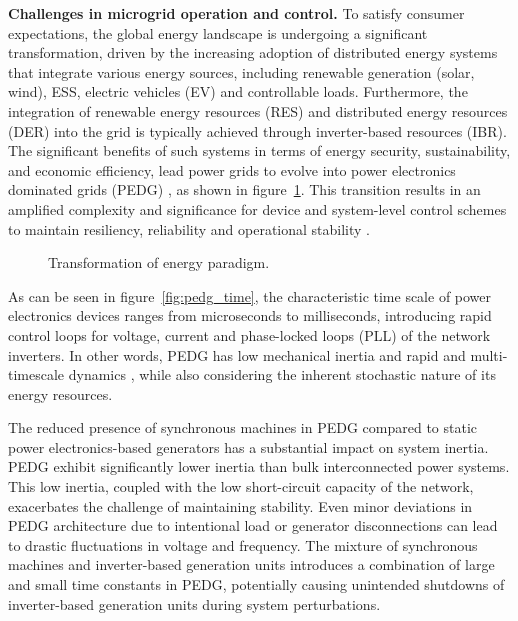 \textbf{Challenges in microgrid operation and control.}
To satisfy consumer expectations, the global energy landscape is undergoing a significant transformation, driven by the increasing adoption of distributed energy systems that integrate various energy sources, including renewable generation (solar, wind), ESS, electric vehicles (EV) and controllable loads. Furthermore, the integration of renewable energy resources (RES) and distributed energy resources (DER) into the grid is typically achieved through inverter-based resources (IBR). The significant benefits of such systems in terms of energy security, sustainability, and economic efficiency, lead power grids to evolve into power electronics dominated grids (PEDG) \autocite{mag_ipakchi_2009}, as shown in figure~\cref{fig:bulk2pedg}. This transition results in an amplified complexity and significance for device and system-level control schemes to maintain resiliency, reliability and operational stability \autocite{mag_khan_2020}. 


\begin{figure}[ht]
    \caption{Transformation of energy paradigm.}\label{fig:bulk2pedg}
\end{figure}

As can be seen in figure~\cref{fig:pedg_time}, the characteristic time scale of power electronics devices ranges from microseconds to milliseconds, introducing rapid control loops for voltage, current and phase-locked loops (PLL) of the network inverters. In other words, PEDG has low mechanical inertia and rapid and multi-timescale dynamics \autocite{7182342}, while also considering the inherent stochastic nature of its energy resources.


The reduced presence of synchronous machines in PEDG compared to static power electronics-based generators has a substantial impact on system inertia. PEDG exhibit significantly lower inertia than bulk interconnected power systems. This low inertia, coupled with the low short-circuit capacity of the network, exacerbates the challenge of maintaining stability. Even minor deviations in PEDG architecture due to intentional load or generator disconnections can lead to drastic fluctuations in voltage and frequency. The mixture of synchronous machines and inverter-based generation units introduces a combination of large and small time constants in PEDG, potentially causing unintended shutdowns of inverter-based generation units during system perturbations.

